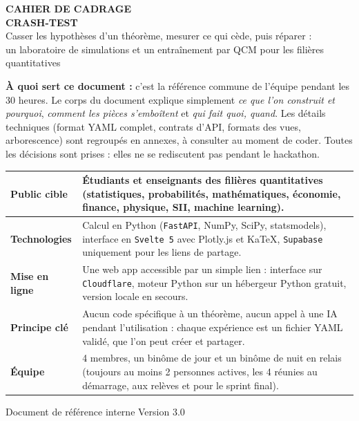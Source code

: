 \documentclass[11pt,a4paper]{article}
\begin{document}
\begin{titlepage}
  \centering
  \vspace*{1.5cm}
  {\Large\color{ctMethod}\textbf{CAHIER DE CADRAGE}}\\[0.5cm]
  {\Huge\bfseries\color{ctPrimary} CRASH-TEST}\\[0.4cm]
  {\large\color{ctBaseline} Casser les hypothèses d'un théorème, mesurer ce qui cède, puis réparer :\\ un laboratoire de simulations et un entraînement par QCM pour les filières quantitatives}\\[1.2cm]

  \begin{tcolorbox}[
    colback=ctBgLight,
    colframe=ctPrimary,
    width=0.94\textwidth,
    arc=4pt,
    boxrule=0.8pt,
    left=12pt, right=12pt, top=10pt, bottom=10pt
  ]
    \textbf{À quoi sert ce document :} c'est la référence commune de l'équipe pendant les 30 heures. Le corps du document explique simplement \emph{ce que l'on construit et pourquoi}, \emph{comment les pièces s'emboîtent} et \emph{qui fait quoi, quand}. Les détails techniques (format YAML complet, contrats d'API, formats des vues, arborescence) sont regroupés en annexes, à consulter au moment de coder. Toutes les décisions sont prises : elles ne se rediscutent pas pendant le hackathon.
  \end{tcolorbox}

  \vspace{1.0cm}
  \begin{tabularx}{0.92\textwidth}{@{}l Y@{}}
    \toprule
    \textbf{Public cible} & Étudiants et enseignants des filières quantitatives (statistiques, probabilités, mathématiques, économie, finance, physique, SII, machine learning). \\
    \midrule
    \textbf{Technologies} & Calcul en Python (\texttt{FastAPI}, NumPy, SciPy, statsmodels), interface en \texttt{Svelte 5} avec Plotly.js et KaTeX, \texttt{Supabase} uniquement pour les liens de partage. \\
    \midrule
    \textbf{Mise en ligne} & Une web app accessible par un simple lien : interface sur \texttt{Cloudflare}, moteur Python sur un hébergeur Python gratuit, version locale en secours. \\
    \midrule
    \textbf{Principe clé} & Aucun code spécifique à un théorème, aucun appel à une IA pendant l'utilisation : chaque expérience est un fichier YAML validé, que l'on peut créer et partager. \\
    \midrule
    \textbf{Équipe} & 4 membres, un binôme de jour et un binôme de nuit en relais (toujours au moins 2 personnes actives, les 4 réunies au démarrage, aux relèves et pour le sprint final). \\
    \bottomrule
  \end{tabularx}

  \vfill
  {\small\color{ctBaseline} Document de référence interne \textbullet{} Version 3.0}
\end{titlepage}
\end{document}
